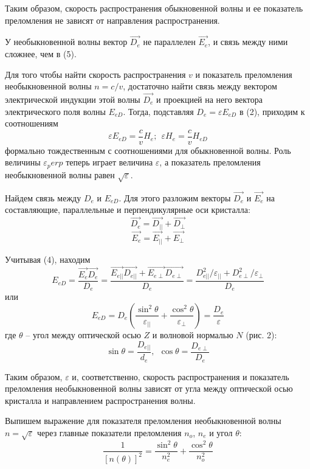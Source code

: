\documentclass[14pt]{article}
\begin{document}
Таким образом, скорость распространения обыкновенной волны
и ее показатель преломления не зависят от направления распространения.

У необыкновенной волны вектор $\vec{D_e}$ не параллелен $\vec{E_e}$, и связь между
ними сложнее, чем в (5).

Для того чтобы найти скорость распространения $v$ и показатель преломления необыкновенной волны
$n = c/v$, достаточно найти связь между вектором электрической индукции этой волны $\vec{D_e}$ и проекцией на него
вектора электрического поля волны $E_{eD}$. Тогда, подставляя
$D_e = \varepsilon E_{eD}$ в (2), приходим
к соотношениям
$$
	\varepsilon E_{eD} = \frac{c}{v}H_e;~~\varepsilon H_e = \frac{c}{v}H_{eD}
$$
\noindent формально тождественным с соотношениями для обыкновенной волны.
Роль величины $\varepsilon_perp$ теперь играет величина $\varepsilon$, а показатель преломления
необыкновенной волны равен $\sqrt{\varepsilon}$.

Найдем связь между $D_e$ и $E_{eD}$. Для этого разложим векторы
$\vec{D_e}$ и $\vec{E_e}$ на составляющие, параллельные и перпендикулярные оси кристалла:
$$
	\vec{D_e} = \vec{D_{||}} + \vec{D_\perp}
$$
$$
	\vec{E_e} = \vec{E_{||}} + \vec{E_\perp}
$$

Учитывая (4), находим
$$
	E_{eD} = \frac{\vec{E_e}\vec{D_e}}{D_e} = \frac{\vec{E_{e||}}\vec{D_{e||}} + \vec{E_{e\perp}}\vec{D_{e\perp}}}{D_e} = 
	\frac{D_{e||}^2/\varepsilon_{||} + D_{e\perp}^2/\varepsilon_\perp}{D_e}
$$
\noindent или
$$
	E_{eD} = D_e\left(\frac{\sin^2\theta}{\varepsilon_{||}} + \frac{\cos^2\theta}{\varepsilon_\perp}\right) = \frac{D_e}{\varepsilon}
$$
\noindent где $\theta$ -- угол между оптической осью $Z$ и волновой нормалью $N$ (рис. 2):
\begin{equation}
	\sin\theta = \frac{D_{e||}}{d_e},~~\cos\theta = \frac{D_{e\perp}}{D_e}
\end{equation}

Таким образом, $\varepsilon$ и, соответственно, скорость распространения и показатель
преломления необыкновенной волны зависят от угла между оптической
осью кристалла и направлением распространения волны.

Выпишем выражение для показателя преломления необыкновенной волны
$n = \sqrt{\varepsilon}$ через главные показатели преломления
$n_o$, $n_e$ и угол $\theta$:
\begin{equation}
	\frac{1}{[n(\theta)]^2} = \frac{\sin^2\theta}{n_e^2} + \frac{\cos^2\theta}{n_o^2}
\end{equation}
\end{document}
